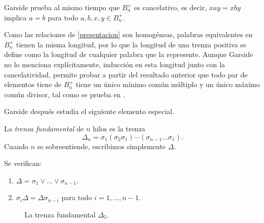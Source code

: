\documentclass[TFG.tex]{subfiles}
\begin{document}
Garside prueba al mismo tiempo que $B_n^+$ es cancelativo, es decir, $xay=xby$ implica $a=b$ para todo $a,b,x,y\in B_n^+$.

Como las relaciones de \ref{presentacion} son homogéneas, palabras equivalentes en $B_n^+$ tienen la misma longitud, por lo que la longitud de una trenza positiva se define como la longitud de cualquier palabra que la represente. Aunque Garside no lo menciona explícitamente, inducción en esta longitud junto con la cancelatividad, permite probar a partir del resultado anterior que todo par de elementos tiene de $B_n^+$ tiene un único mínimo común múltiplo y un único máximo común divisor, tal como se prueba en \cite{Dehornoy}. 

Garside después estudia el siguiente elemento especial.
\begin{defi}
La \emph{trenza fundamental} de $n$ hilos es la trenza
$$\Delta_n=\sigma_1(\sigma_2\sigma_1)\cdots(\sigma_{n-1}\dots\sigma_1).$$
Cuando $n$ se sobreentiende, escribimos simplemente $\Delta$. 
\end{defi} 
\newpage
\begin{prop}\label{conjuga}
Se verifican: 
\begin{enumerate}
\item $\Delta=\sigma_1\lor\dots\lor\sigma_{n-1}$.
\item $\sigma_i\Delta=\Delta\sigma_{n-i}$ para todo $i=1,\dots, n-1$.
\end{enumerate}
\end{prop} 


\begin{figure}[h!]
\centering
{}
\caption{La trenza fundamental $\Delta_5$.}
\end{figure}
\end{document}
